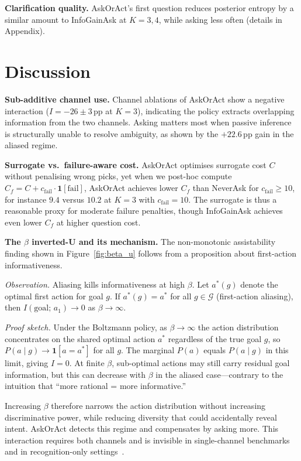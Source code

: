 \documentclass[10pt,twocolumn]{article}
\begin{document}
\textbf{Clarification quality.}
AskOrAct's first question reduces posterior entropy by a similar amount to InfoGainAsk at $K{=}3,4$, while asking less often (details in Appendix).

\section{Discussion}

\textbf{Sub-additive channel use.}
Channel ablations of AskOrAct show a negative interaction ($I{=}-26 \pm 3$\,pp at $K{=}3$), indicating the policy extracts overlapping information from the two channels.
Asking matters most when passive inference is structurally unable to resolve ambiguity, as shown by the $+22.6$\,pp gain in the aliased regime.

\textbf{Surrogate vs.\ failure-aware cost.}
AskOrAct optimises surrogate cost $C$ without penalising wrong picks, yet when we post-hoc compute $C_f = C + c_\text{fail} \cdot \mathbf{1}[\text{fail}]$, AskOrAct achieves lower $C_f$ than NeverAsk for $c_\text{fail} \geq 10$, for instance $9.4$ versus $10.2$ at $K{=}3$ with $c_\text{fail}{=}10$.
The surrogate is thus a reasonable proxy for moderate failure penalties, though InfoGainAsk achieves even lower $C_f$ at higher question cost.

\textbf{The $\beta$ inverted-U and its mechanism.}
The non-monotonic assistability finding shown in Figure~\ref{fig:beta_u} follows from a proposition about first-action informativeness.

\textit{Observation.} Aliasing kills informativeness at high $\beta$.
Let $a^*(g)$ denote the optimal first action for goal $g$.
If $a^*(g) = a^*$ for all $g \in \mathcal{G}$ (first-action aliasing), then $I(\text{goal};\, a_1) \to 0$ as $\beta \to \infty$.

\textit{Proof sketch.}
Under the Boltzmann policy, as $\beta \to \infty$ the action distribution concentrates on the shared optimal action $a^*$ regardless of the true goal $g$, so $P(a \mid g) \to \mathbf{1}[a = a^*]$ for all $g$.
The marginal $P(a)$ equals $P(a \mid g)$ in this limit, giving $I = 0$.
At finite $\beta$, sub-optimal actions may still carry residual goal information, but this can decrease with $\beta$ in the aliased case---contrary to the intuition that ``more rational = more informative.''

Increasing $\beta$ therefore narrows the action distribution without increasing discriminative power, while reducing diversity that could accidentally reveal intent.
AskOrAct detects this regime and compensates by asking more.
This interaction requires both channels and is invisible in single-channel benchmarks~\cite{kobalczyk2025active,grand2026shoot,tan2024clips} and in recognition-only settings~\cite{keren2014grd,zhang2025pagr}.
\end{document}
